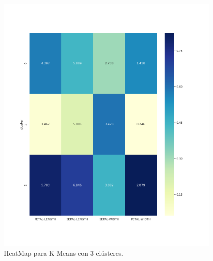\documentclass[a4paper, 20pt]{article}
\begin{document}
\begin{figure}[h]
\centering
\includegraphics[scale=0.63]{dani/heatmapK-MeansIRIS.png}
\caption{HeatMap para K-Means con 3 clústeres.}
\label{hmkm}
\end{figure}
\end{document}
